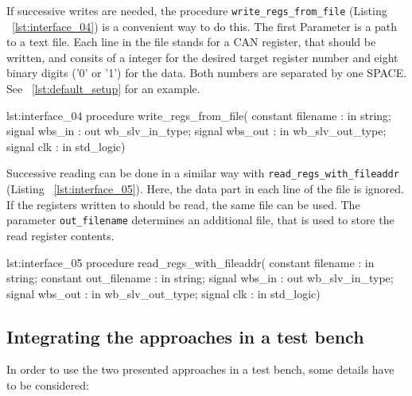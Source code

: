 If successive writes are needed, the procedure \verb=write_regs_from_file= (Listing ~\ref{lst:interface_04}) is a convenient way to do this. The first Parameter is a path to a text file. Each line in the file stands for a CAN register, that should be written, and consits of a integer for the desired target register number and eight binary digits ('0' or '1') for the data. Both numbers are separated by one SPACE. See ~\ref{lst:default_setup} for an example.

\begin{vhdl}[Interface]{lst:interface_04}
    procedure write_regs_from_file(   
        constant filename 	: in string;
        signal wbs_in 		: out wb_slv_in_type;
        signal wbs_out 		: in wb_slv_out_type;
        signal       clk 	: in std_logic)
\end{vhdl}

Successive reading can be done in a similar way with \verb=read_regs_with_fileaddr= (Listing ~\ref{lst:interface_05}). Here, the data part in each line of the file is ignored. If the registers written to should be read, the same file can be used. The parameter \verb=out_filename= determines an additional file, that is used to store the read register contents.

\begin{vhdl}[Interface]{lst:interface_05}
procedure read_regs_with_fileaddr(   
        constant filename 		: in string;
        constant out_filename 	: in string;
        signal wbs_in 			: out wb_slv_in_type;
        signal wbs_out 			: in wb_slv_out_type;
        signal clk 				: in std_logic)
\end{vhdl}


\subsection{Integrating the approaches in a test bench}
\label{subsec:int_tb}
In order to use the two presented approaches in a test bench, some details have to be considered:

